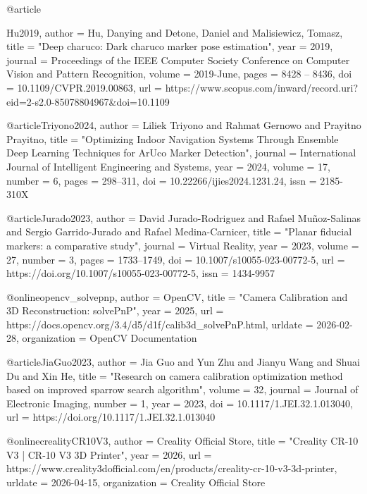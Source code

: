 @article{Hu2019,
	author    = {Hu, Danying and Detone, Daniel and Malisiewicz, Tomasz},
	title     = "{Deep charuco: Dark charuco marker pose estimation}",
	year      = {2019},
	journal   = {Proceedings of the IEEE Computer Society Conference on Computer Vision and Pattern Recognition},
	volume    = {2019-June},
	pages     = {8428 – 8436},
	doi       = {10.1109/CVPR.2019.00863},
	url       = {https://www.scopus.com/inward/record.uri?eid=2-s2.0-85078804967&doi=10.1109%
}

@article{Triyono2024,
	author    = {Liliek Triyono and Rahmat Gernowo and Prayitno Prayitno},
	title     = "{Optimizing Indoor Navigation Systems Through Ensemble Deep Learning Techniques for ArUco Marker Detection}",
	journal   = {International Journal of Intelligent Engineering and Systems},
	year      = {2024},
	volume    = {17},
	number    = {6},
	pages     = {298--311},
	doi       = {10.22266/ijies2024.1231.24},
	issn      = {2185-310X}
}

@article{Jurado2023,
	author    = {David Jurado-Rodriguez and Rafael Muñoz-Salinas and Sergio Garrido-Jurado and Rafael Medina-Carnicer},
	title     = "{Planar fiducial markers: a comparative study}",
	journal   = {Virtual Reality},
	year      = {2023},
	volume    = {27},
	number    = {3},
	pages     = {1733--1749},
	doi       = {10.1007/s10055-023-00772-5},
	url       = {https://doi.org/10.1007/s10055-023-00772-5},
	issn      = {1434-9957}
}

@online{opencv_solvepnp,
	author       = {{OpenCV}},
	title        = "{Camera Calibration and 3D Reconstruction: solvePnP}",
	year         = {2025},
	url          = {https://docs.opencv.org/3.4/d5/d1f/calib3d_solvePnP.html},
	urldate      = {2026-02-28},
	organization = {OpenCV Documentation}
}

@article{JiaGuo2023,
	author    = {Jia Guo and Yun Zhu and Jianyu Wang and Shuai Du and Xin He},
	title     = "{Research on camera calibration optimization method based on improved sparrow search algorithm}",
	volume    = {32},
	journal   = {Journal of Electronic Imaging},
	number    = {1},
	year      = {2023},
	doi       = {10.1117/1.JEI.32.1.013040},
	url       = {https://doi.org/10.1117/1.JEI.32.1.013040}
}

@online{crealityCR10V3,
	author       = {{Creality Official Store}},
	title        = "{Creality CR-10 V3 | CR-10 V3 3D Printer}",
	year         = {2026},
	url          = {https://www.creality3dofficial.com/en/products/creality-cr-10-v3-3d-printer},
	urldate      = {2026-04-15},
	organization = {Creality Official Store}
}

}

